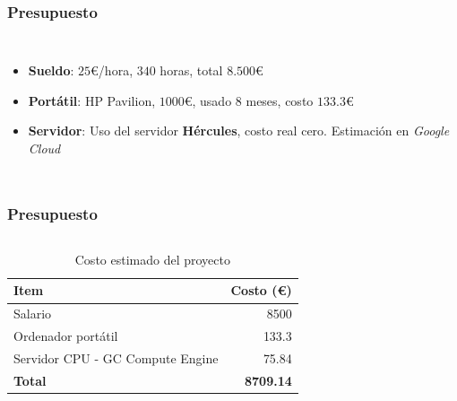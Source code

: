 \begin{frame}
    \frametitle{Presupuesto}
    \begin{columns}
        \begin{itemize}
            \item \textbf{Sueldo}: $25$€/hora, $340$ horas, total $8.500$€
            \item \textbf{Portátil}: HP Pavilion, $1000$€, usado $8$ meses, costo $133.3$€
            \item \textbf{Servidor}: Uso del servidor \textbf{Hércules}, costo real cero. Estimación en \textit{Google Cloud}
        \end{itemize}
    \end{columns}
\end{frame}

\note{

}

\begin{frame}
    \frametitle{Presupuesto}
    \begin{columns}
        \begin{table}[htp]
            \centering
            \begin{tabular}{|l|r|}
                \hline
                \textbf{Item}                    & \textbf{Costo (€)} \\ \hline
                Salario                          & 8500               \\
                Ordenador portátil               & 133.3              \\
                Servidor CPU - GC Compute Engine & 75.84              \\
                \textbf{Total}                   & \textbf{8709.14}   \\ \hline
            \end{tabular}
            \caption{Costo estimado del proyecto}
        \end{table}
    \end{columns}
\end{frame}